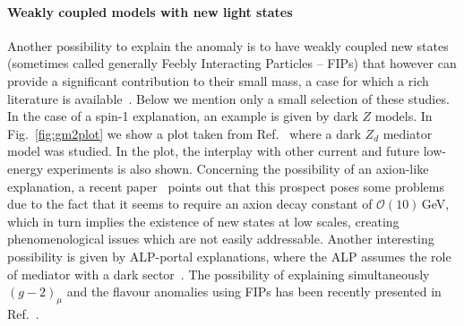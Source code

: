 \documentclass[10pt]{article}
\begin{document}
\paragraph{Weakly coupled models with new light states}
%
Another possibility to explain the anomaly is to have weakly coupled new states (sometimes
called generally Feebly Interacting Particles -- FIPs) that however can provide a significant contribution to their small mass, a case for which a rich literature is available~\cite{Holdom:1985ag,Pospelov:2008zw,Chen:2015vqy,Davoudiasl:2018fbb,Darme:2020sjf,Cadeddu:2021dqx,Buen-Abad:2021fwq,Darme:2021qzw}. Below we mention only a small selection of these studies.
In the case of a spin-1 explanation, an example is given by dark $Z$ models. In Fig.~\ref{fig:gm2plot} we show a plot taken from Ref.~\cite{Cadeddu:2021dqx} where a dark $Z_d$ mediator model was studied. In the plot, the interplay with other current and future low-energy experiments is also shown.
Concerning the possibility of an axion-like explanation, a recent paper~\cite{Buen-Abad:2021fwq} points out that this prospect poses some problems due to the fact that it seems to require an axion decay constant of $\mathcal{O}(10)$\,GeV, which in turn implies the existence of new states at low scales, creating phenomenological issues which are not easily addressable.
Another interesting possibility is given by ALP-portal explanations, where the ALP assumes the role of mediator with a dark sector~\cite{Darme:2020sjf}. The possibility of explaining simultaneously $(g-2)_{\mu}$ and the flavour anomalies using FIPs has been recently presented in Ref.~\cite{Darme:2021qzw}.
\end{document}
